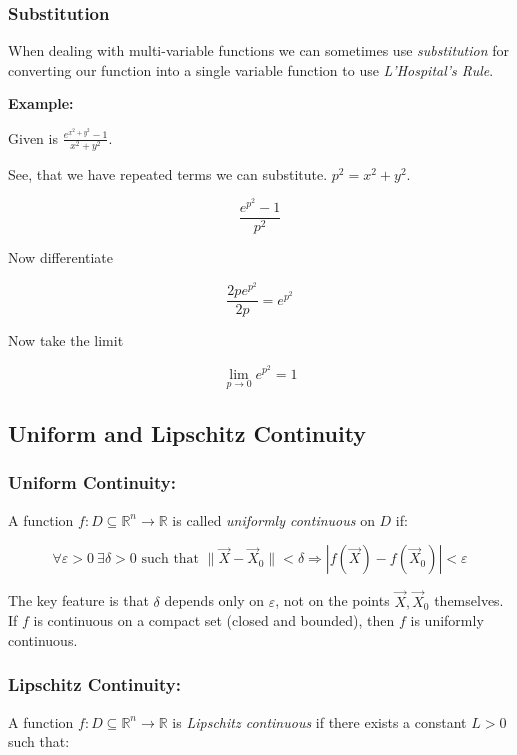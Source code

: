 \subsubsection{Substitution}

When dealing with multi-variable functions we can sometimes use \emph{substitution} 
for converting our function into a single variable function to use \emph{L'Hospital's Rule}.
\vspace{\baselineskip}

\textbf{Example:}
\vspace{\baselineskip}

Given is \(\frac{e^{x^2 + y^2} - 1}{x^2 + y^2}\).
\vspace{\baselineskip}

See, that we have repeated terms we can substitute. \(p^2 = x^2 + y^2\).

\[
\frac{e^{p^2} - 1}{p^2}
\]

Now differentiate

\[
\frac{2p e^{p^2} }{2p} = e^{p^2}
\]

Now take the limit

\[
\lim_{p \to 0} e^{p^2} = 1
\]

\subsection{Uniform and Lipschitz Continuity}

\subsubsection{Uniform Continuity:}  
A function \( f : D \subseteq \mathbb{R}^n \to \mathbb{R} \) is called \emph{uniformly continuous} on \( D \) if:

\[
\forall \varepsilon > 0 \ \exists \delta > 0 \text{ such that } \|\vec{X} - \vec{X}_0\| < \delta \Rightarrow |f(\vec{X}) - f(\vec{X}_0)| < \varepsilon
\]

The key feature is that \( \delta \) depends only on \( \varepsilon \), not on the points \( \vec{X}, \vec{X}_0 \) themselves.  
If \( f \) is continuous on a compact set (closed and bounded), then \( f \) is uniformly continuous.

\subsubsection{Lipschitz Continuity:}  
A function \( f : D \subseteq \mathbb{R}^n \to \mathbb{R} \) is \emph{Lipschitz continuous} if there exists a constant \( L > 0 \) such that:

